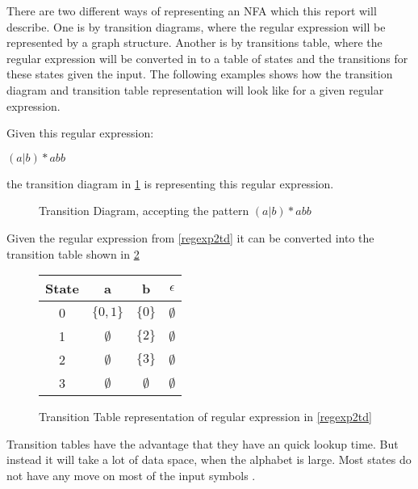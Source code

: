 There are two different ways of representing an NFA which this report will
describe. One is by transition diagrams, where the regular expression will be
represented by a graph structure. Another is by transitions table, where the 
regular expression will be converted in to a table of states and the 
transitions for these states given the input. The following examples shows how 
the transition diagram and transition table representation will look like for a 
given regular expression.

\begin{example} \label{regexp2td}
Given this regular expression:
\begin{center} $(a | b)* abb$ \end{center}
the transition diagram in \cref{fig:td} is representing this regular expression.
\end{example}
\begin{figure}[h!]
  \centering
  \caption{Transition Diagram, accepting the pattern  $(a | b)* abb$ 
  \label{fig:td}}
  \end{figure}

\begin{example} \label{regexp2tt}
Given the regular expression from \cref{regexp2td} it can be converted into the transition table shown in \cref{fig:tt}
\end{example}
\begin{figure}[h!]
  \centering
  \begin{tabular}{| c | c c c |}
    \hline
    \hline
    State & a & b & $\epsilon$\\
    \hline
    0 & $\{0, 1\}$ & $\{0\}$ & $\emptyset$ \\
    1 & $\emptyset$ & $\{2\}$ & $\emptyset$ \\
    2 & $\emptyset$ & $\{3\}$ & $\emptyset$ \\
    3 & $\emptyset$ & $\emptyset$ & $\emptyset$ \\
    \hline
  \end{tabular}
  \caption{Transition Table representation of regular expression in 
        \cref{regexp2td} \label{fig:tt}}
\end{figure}
Transition tables have the advantage that they have an quick lookup time. But 
instead it will take a lot of data space, when the alphabet is large. Most 
states do not have any move on most of the input symbols \cite{Aho2006}.
